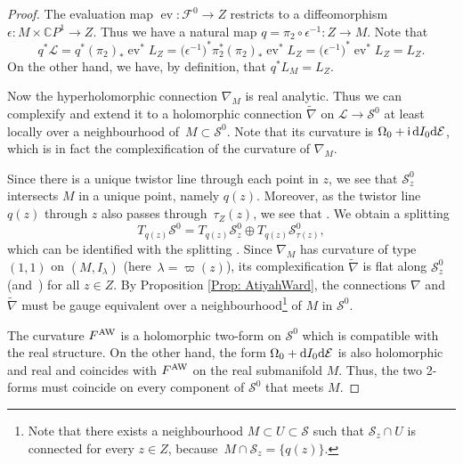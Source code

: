 \documentclass[pdftex]{sigma}
\numberwithin{equation}{section}
\theoremstyle{definition}
\newcommand\C{{\mathbb C}}
\renewcommand{\i}{\mathsf{i}}
\begin{document}
\begin{proof}
The evaluation map $\operatorname{ev}\colon \mathcal F^0 \longrightarrow
Z$ restricts to a diffeomorphism $\epsilon\colon M\times \C P^1 \longrightarrow
Z$. Thus we have a natural map
$q = \pi_2\circ\epsilon^{-1}\colon Z
 \longrightarrow M$.
Note that
\[q^*\mathcal L = q^*(\pi_2)_*\operatorname{ev}^*L_Z
 = \bigl(\epsilon^{-1}\bigr)^*\pi_2^*(\pi_2)_*\operatorname{ev}^*L_Z
 = \bigl(\epsilon^{-1}\bigr)^*\operatorname{ev}^*L_Z = L_Z.\]
On the other hand, we have, by definition, that $q^*L_M = L_Z$.

Now the hyperholomorphic connection $\nabla_M$ is real analytic. Thus we can complexify and
extend it to a holomorphic connection $\widetilde\nabla$ on $\mathcal
L \longrightarrow \mathcal S^0$ at least locally over a neighbourhood of~${M \subset
\mathcal S^0}$. Note that its curvature is $\Omega_0 + \i \, {\rm d}I_0 {\rm d} \mathcal E$, which is in
fact the complexification of the curvature of $\nabla_M$.

Since there is a unique twistor line through each point in $z$, we see that ${\mathcal S}_z^0$ intersects $M$
in a unique point, namely $q(z)$. Moreover, as the twistor line $q(z)$ through $z$ also passes through~$\tau_Z(z)$, we see that . We obtain a splitting
\[
T_{q(z)}\mathcal S^0 = T_{q(z)}\mathcal S_z^0 \oplus T_{q(z)}\mathcal S_{\tau(z)}^0,
\]
which can be identified with the splitting \smash{$T_{q(z)}M\otimes \C = T^{1,0,\lambda}M \oplus T^{0,1,\lambda}M$}.
Since $\nabla_M$ has curvature of type $(1,1)$ on $(M, I_\lambda)$ (here~$\lambda
 = \varpi(z)$), its complexification $\widetilde\nabla$ is flat along $\mathcal S_z^0$
\big(and~\big) for all $z \in Z$.
By Proposition \ref{Prop: AtiyahWard}, the connections $\nabla$ and $\widetilde \nabla$ must be
gauge equivalent over a neighbourhood\footnote{Note that there exists a neighbourhood $M
 \subset U \subset \mathcal{S}$ such that $\mathcal{S}_z\cap U$ is connected for
every $z \in Z$, because~${M\cap \mathcal{S}_z = \{ q(z)\}}$.} of $M$ in $\mathcal S^0$.

The curvature $F^{\rm AW}$ is a holomorphic two-form on $\mathcal S^0$ which is
compatible with the real structure. On the other hand, the form $\Omega_0 + {\rm d}I_0{\rm d}\mathcal E$ is also
holomorphic and real and coincides with $F^{\rm AW}$ on the real submanifold $M$. Thus, the two 2-forms
must coincide on every component of $\mathcal S^0$ that meets $M$.
\end{proof}
\end{document}
